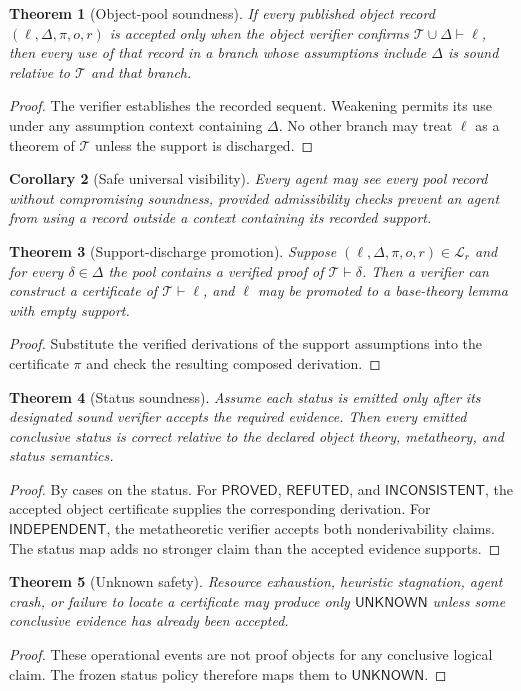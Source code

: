 \documentclass[11pt]{article}
\newtheorem{theorem}{Theorem}[section]
\newtheorem{corollary}[theorem]{Corollary}
\theoremstyle{definition}
\theoremstyle{remark}
\newcommand{\T}{\mathcal T}
\newcommand{\Pool}{\mathcal L}
\newcommand{\Prov}{\mathsf{PROVED}}
\newcommand{\Refut}{\mathsf{REFUTED}}
\newcommand{\Ind}{\mathsf{INDEPENDENT}}
\newcommand{\Inc}{\mathsf{INCONSISTENT}}
\newcommand{\Unknown}{\mathsf{UNKNOWN}}
\begin{document}
\begin{theorem}[Object-pool soundness]
If every published object record $(\ell,\Delta,\pi,o,r)$ is accepted only when the object verifier confirms $\T\cup\Delta\vdash\ell$, then every use of that record in a branch whose assumptions include $\Delta$ is sound relative to $\T$ and that branch.
\end{theorem}
\begin{proof}
The verifier establishes the recorded sequent. Weakening permits its use under any assumption context containing $\Delta$. No other branch may treat $\ell$ as a theorem of $\T$ unless the support is discharged.
\end{proof}

\begin{corollary}[Safe universal visibility]
Every agent may see every pool record without compromising soundness, provided admissibility checks prevent an agent from using a record outside a context containing its recorded support.
\end{corollary}

\begin{theorem}[Support-discharge promotion]
Suppose $(\ell,\Delta,\pi,o,r)\in\Pool_r$ and for every $\delta\in\Delta$ the pool contains a verified proof of $\T\vdash\delta$. Then a verifier can construct a certificate of $\T\vdash\ell$, and $\ell$ may be promoted to a base-theory lemma with empty support.
\end{theorem}
\begin{proof}
Substitute the verified derivations of the support assumptions into the certificate $\pi$ and check the resulting composed derivation.
\end{proof}

\begin{theorem}[Status soundness]
Assume each status is emitted only after its designated sound verifier accepts the required evidence. Then every emitted conclusive status is correct relative to the declared object theory, metatheory, and status semantics.
\end{theorem}
\begin{proof}
By cases on the status. For $\Prov$, $\Refut$, and $\Inc$, the accepted object certificate supplies the corresponding derivation. For $\Ind$, the metatheoretic verifier accepts both nonderivability claims. The status map adds no stronger claim than the accepted evidence supports.
\end{proof}

\begin{theorem}[Unknown safety]
Resource exhaustion, heuristic stagnation, agent crash, or failure to locate a certificate may produce only $\Unknown$ unless some conclusive evidence has already been accepted.
\end{theorem}
\begin{proof}
These operational events are not proof objects for any conclusive logical claim. The frozen status policy therefore maps them to $\Unknown$.
\end{proof}
\end{document}
